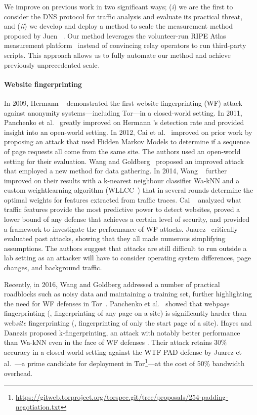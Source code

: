 We improve on previous work in two significant ways; (\emph{i}) we are the first
to consider the DNS protocol for traffic analysis and evaluate its practical
threat, and (\emph{ii}) we develop and deploy a method to scale the measurement
method proposed by Juen \ea~\cite{Juen2015a}.  Our method leverages the
volunteer-run RIPE Atlas measurement platform~\cite{atlas} instead of convincing
relay operators to run third-party scripts.  This approach allows us to fully
automate our method and achieve previously unprecedented scale.

\paragraph{Website fingerprinting}
In 2009, Hermann \ea~\cite{Hermann2009a} demonstrated the first website
fingerprinting (WF) attack against anonymity systems---including Tor---in a
closed-world setting.  In 2011, Panchenko et al.~\cite{Panchenko2011a} greatly
improved on Hermann \ea's detection rate and provided insight into an open-world
setting.  In 2012, Cai et al.~\cite{Cai2012a} improved on prior work by
proposing an attack that used Hidden Markov Models to determine if a sequence of
page requests all come from the same site.  The authors used an open-world
setting for their evaluation.  Wang and Goldberg~\cite{Wang2013a} proposed an
improved attack that employed a new method for data gathering.  In 2014, Wang
\ea~\cite{Wang2014a} further improved on their results with a
k-nearest neighbour classifier Wa-kNN and a custom weightlearning algorithm
(WLLCC~\cite{WangThesis}) that in several rounds determine the optimal weights
for features extracted from traffic traces.
Cai \ea~\cite{Cai2014b}
analyzed what traffic features provide the most predictive power to detect
websites, proved a lower bound of any defense that achieves a certain level of
security, and provided a framework to investigate the performance of
WF attacks.  Juarez~\cite{Juarez2014a} critically evaluated past
attacks, showing that they all made numerous simplifying
assumptions.  The authors suggest that attacks are still
difficult to run outside a lab setting as an attacker will have to consider
operating system differences, page changes, and background traffic.

Recently, in 2016, Wang and Goldberg addressed a number of practical
roadblocks such as noisy data and maintaining a training set,
further highlighting the need for WF defenses in Tor~\cite{taoianreally}.
Panchenko et al.~\cite{Panchenko2016a} showed that
web\emph{page} fingerprinting (\ie, fingerprinting of any page on a site) is
significantly harder than web\emph{site} fingerprinting (\ie,
fingerprinting of only the start page of a site).
Hayes and Danezis proposed k-fingerprinting, an attack with
notably better performance than Wa-kNN even in the face of
WF defenses \cite{kfingerprinting}. Their attack retains 30\% accuracy in a
closed-world setting against the WTF-PAD defense by
Juarez et al.~\cite{DBLP:journals/corr/JuarezIPDW15}---a prime candidate for
deployment in Tor\footnote{\url{https://gitweb.torproject.org/torspec.git/tree/proposals/254-padding-negotiation.txt}}---at
the cost of 50\% bandwidth overhead.

